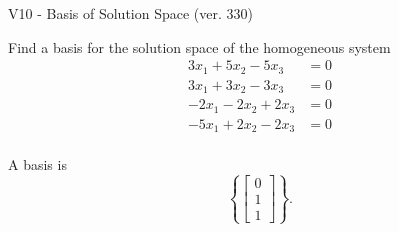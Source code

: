 \begin{exercise}
  \begin{exerciseTitle}V10 - Basis of Solution Space (ver. 330)\end{exerciseTitle}
  \begin{exerciseStatement}
    Find a basis for the solution space of the homogeneous system 
\begin{align*}
 3 x_ 1 + 5 x_ 2 -5 x_ 3 &= 0  \\ 
  3 x_ 1 + 3 x_ 2 -3 x_ 3 &= 0  \\ 
  -2 x_ 1 -2 x_ 2 + 2 x_ 3 &= 0  \\ 
  -5 x_ 1 + 2 x_ 2 -2 x_ 3 &= 0  \\ 
 \end{align*}


 
  \end{exerciseStatement}

  \begin{exerciseAnswer}
   A basis is   
\[\left\{\left[\begin{array}{c}
0 \\
1 \\
1
\end{array}\right]\right\}.\]

  


  \end{exerciseAnswer}
\end{exercise}
